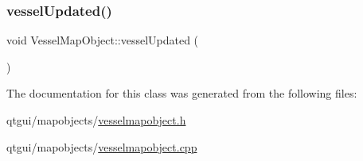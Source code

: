 \mbox{\label{class_vessel_map_object_a9c8d4f792897b7e7f8bbbd2b7091e958}} 
\subsubsection{\texorpdfstring{vesselUpdated()}{vesselUpdated()}}
{\footnotesize\ttfamily void Vessel\+Map\+Object\+::vessel\+Updated (\begin{DoxyParamCaption}{ }\end{DoxyParamCaption})}



The documentation for this class was generated from the following files\+:\begin{DoxyCompactItemize}
\item 
qtgui/mapobjects/\mbox{\hyperlink{vesselmapobject_8h}{vesselmapobject.\+h}}\item 
qtgui/mapobjects/\mbox{\hyperlink{vesselmapobject_8cpp}{vesselmapobject.\+cpp}}\end{DoxyCompactItemize}
